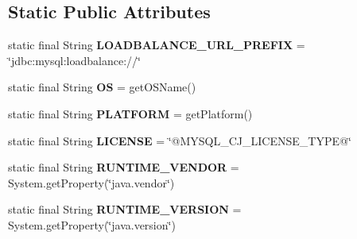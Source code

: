 \subsection*{Static Public Attributes}
\begin{DoxyCompactItemize}
\item 
\mbox{\label{classcom_1_1mysql_1_1jdbc_1_1_non_registering_driver_af2050cfec6f1483f02246475a211f27d}} 
static final String {\bfseries L\+O\+A\+D\+B\+A\+L\+A\+N\+C\+E\+\_\+\+U\+R\+L\+\_\+\+P\+R\+E\+F\+IX} = \char`\"{}jdbc\+:mysql\+:loadbalance\+://\char`\"{}
\item 
\mbox{\label{classcom_1_1mysql_1_1jdbc_1_1_non_registering_driver_a2ff9307edcaf02ffa041626f94f80a0f}} 
static final String {\bfseries OS} = get\+O\+S\+Name()
\item 
\mbox{\label{classcom_1_1mysql_1_1jdbc_1_1_non_registering_driver_a3964f16a3c1191ba38865b31d3836dda}} 
static final String {\bfseries P\+L\+A\+T\+F\+O\+RM} = get\+Platform()
\item 
\mbox{\label{classcom_1_1mysql_1_1jdbc_1_1_non_registering_driver_ab7000a627089fe191f4022f4d0130116}} 
static final String {\bfseries L\+I\+C\+E\+N\+SE} = \char`\"{}@M\+Y\+S\+Q\+L\+\_\+\+C\+J\+\_\+\+L\+I\+C\+E\+N\+S\+E\+\_\+\+T\+Y\+PE@\char`\"{}
\item 
\mbox{\label{classcom_1_1mysql_1_1jdbc_1_1_non_registering_driver_a4d115202272c41ae10a952eb93a42f52}} 
static final String {\bfseries R\+U\+N\+T\+I\+M\+E\+\_\+\+V\+E\+N\+D\+OR} = System.\+get\+Property(\char`\"{}java.\+vendor\char`\"{})
\item 
\mbox{\label{classcom_1_1mysql_1_1jdbc_1_1_non_registering_driver_aa618f908522f2a3efc709eb881f343e6}} 
static final String {\bfseries R\+U\+N\+T\+I\+M\+E\+\_\+\+V\+E\+R\+S\+I\+ON} = System.\+get\+Property(\char`\"{}java.\+version\char`\"{})
\item 
\mbox{\label{classcom_1_1mysql_1_1jdbc_1_1_non_registering_driver_ab42550b896afef62913b8d9c7337f481}} 

\end{DoxyCompactItemize}
